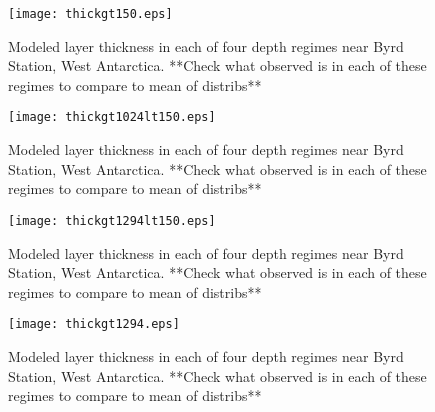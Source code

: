 \documentclass[jgrga]{agutex}
\begin{document}
\begin{figure}
	\texttt{[image: thickgt150.eps]}
	\label{accum}
	\caption{Modeled layer thickness in each of four depth regimes near Byrd Station, West Antarctica. **Check what observed is in each of these regimes to compare to mean of distribs** }
\end{figure}
\begin{figure}
	\texttt{[image: thickgt1024lt150.eps]}
	\label{accum}
	\caption{Modeled layer thickness in each of four depth regimes near Byrd Station, West Antarctica. **Check what observed is in each of these regimes to compare to mean of distribs** }
\end{figure}
\begin{figure}
	\texttt{[image: thickgt1294lt150.eps]}
	\label{accum}
	\caption{Modeled layer thickness in each of four depth regimes near Byrd Station, West Antarctica. **Check what observed is in each of these regimes to compare to mean of distribs** }
\end{figure}
\begin{figure}
	\texttt{[image: thickgt1294.eps]}
	\label{accum}
	\caption{Modeled layer thickness in each of four depth regimes near Byrd Station, West Antarctica. **Check what observed is in each of these regimes to compare to mean of distribs** }
\end{figure}



\end{document}

